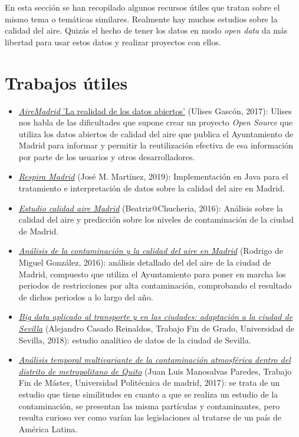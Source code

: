 
En esta sección se han recopilado algunos recursos  útiles que tratan sobre el mismo tema o temáticas similares. Realmente hay muchos estudios sobre la calidad del aire. Quizás el hecho de tener los datos en modo \textit{open data} da más libertad para usar estos datos y realizar proyectos con ellos.

\section{Trabajos útiles}

\begin{itemize}
	\item \href{https://github.com/UlisesGascon/Charla-AireMadrid-los-datos-abiertos}{\textit{AireMadrid} 'La realidad de los datos abiertos'} (Ulises Gascón, 2017): Ulises nos habla de las dificultades que supone crear un proyecto \textit{Open Source} que utiliza los datos abiertos de calidad del aire que publica el Ayuntamiento de Madrid para informar y permitir la reutilización efectiva de esa información por parte de los usuarios y otros desarrolladores.
	\item \href{https://github.com/Toolson12/poisonMAD}{\textit{Respira Madrid}} (José M. Martínez, 2019): Implementación en Java para el tratamiento e interpretación de datos sobre la calidad del aire en Madrid.
	\item \href{https://github.com/chucheria/CalidadAire}{\textit{Estudio calidad aire Madrid}} (Beatriz@Chucheria, 2016): Análisis sobre la calidad del aire y predicción sobre los niveles de contaminación de la ciudad de Madrid.
	\item \href{https://www.rodrigodemiguel.es/AnalisisAireMadrid/}{\textit{Análisis de la contaminación y la calidad del aire en Madrid}} (Rodrigo de Miguel González, 2016): análisis detallado del  del aire de la ciudad de Madrid, compuesto que utiliza el Ayuntamiento para poner en marcha los periodos de restricciones por alta contaminación, comprobando el resultado de dichos periodos a lo largo del año.
	\item \href{https://idus.us.es/xmlui/handle/11441/79499}{\textit{Big data aplicado al transporte y en las ciudades: adaptación a la ciudad de Sevilla}} (Alejandro Casado Reinaldos, Trabajo Fin de Grado, Universidad de Sevilla, 2018): estudio analítico de datos de la ciudad de Sevilla. 
	\item \href{http://oa.upm.es/47313/}{\textit{Análisis temporal multivariante de la contaminación atmosférica dentro del distrito de metropolitano de Quito}} (Juan Luis Manosalvas Paredes, Trabajo Fin de Máster, Universidad Politécnica de madrid, 2017): se trata de un estudio que tiene  similitudes en cuanto a que se realiza un estudio de la contaminación, se presentan las misma partículas y contaminantes, pero resulta curioso ver como varían las legislaciones al tratarse de un país de América Latina.

\end{itemize}
